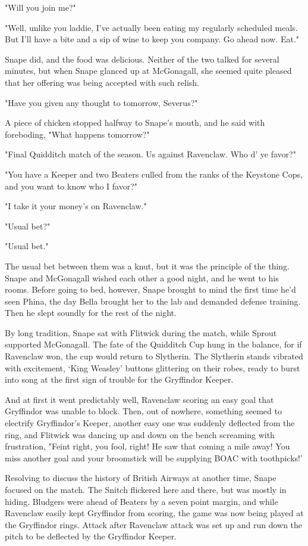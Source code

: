 \documentclass[a4paper,11pt]{article}
\begin{document}
"Will you join me?"

"Well, unlike you laddie, I've actually been eating my regularly scheduled meals. But I'll have a bite and a sip of wine to keep you company. Go ahead now. Eat."

Snape did, and the food was delicious. Neither of the two talked for several minutes, but when Snape glanced up at McGonagall, she seemed quite pleased that her offering was being accepted with such relish.

"Have you given any thought to tomorrow, Severus?"

A piece of chicken stopped halfway to Snape's mouth, and he said with foreboding, "What happens tomorrow?"

"Final Quidditch match of the season. Us against Ravenclaw. Who d' ye favor?"

"You have a Keeper and two Beaters culled from the ranks of the Keystone Cops, and you want to know who I favor?"

"I take it your money's on Ravenclaw."

"Usual bet?"

"Usual bet."

The usual bet between them was a knut, but it was the principle of the thing. Snape and McGonagall wished each other a good night, and he went to his rooms. Before going to bed, however, Snape brought to mind the first time he'd seen Phina, the day Bella brought her to the lab and demanded defense training. Then he slept soundly for the rest of the night.

By long tradition, Snape sat with Flitwick during the match, while Sprout supported McGonagall. The fate of the Quidditch Cup hung in the balance, for if Ravenclaw won, the cup would return to Slytherin. The Slytherin stands vibrated with excitement, `King Weasley' buttons glittering on their robes, ready to burst into song at the first sign of trouble for the Gryffindor Keeper.

And at first it went predictably well, Ravenclaw scoring an easy goal that Gryffindor was unable to block. Then, out of nowhere, something seemed to electrify Gryffindor's Keeper, another easy one was suddenly deflected from the ring, and Flitwick was dancing up and down on the bench screaming with frustration, "Feint right, you fool, right! He saw that coming a mile away! You miss another goal and your broomstick will be supplying BOAC with toothpicks!'

Resolving to discuss the history of British Airways at another time, Snape focused on the match. The Snitch flickered here and there, but was mostly in hiding. Bludgers were ahead of Beaters by a seven point margin, and while Ravenclaw easily kept Gryffindor from scoring, the game was now being played at the Gryffindor rings. Attack after Ravenclaw attack was set up and run down the pitch to be deflected by the Gryffindor Keeper.
\end{document}
